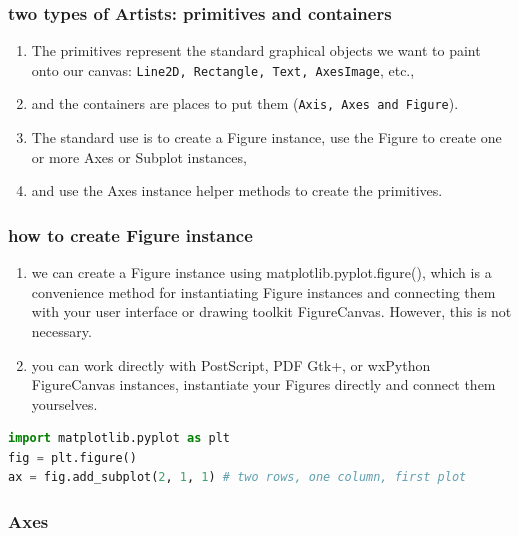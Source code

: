 \documentclass[UTF8,a4paper,12pt]{ctexart}  %
\providecommand{\tightlist}{\setlength{\itemsep}{0pt}\setlength{\parskip}{0pt}}
\newcommand{\passthrough}[1]{\lstset{mathescape=false}#1\lstset{mathescape=true}}
\begin{document}
\hypertarget{two-types-of-artists-primitives-and-containers}{%
\subsubsection{two types of Artists: primitives and containers}\label{two-types-of-artists-primitives-and-containers}}

\begin{enumerate}
\def\labelenumi{\arabic{enumi}.}
\tightlist
\item
  The primitives represent the standard graphical objects we want to
  paint onto our canvas: \passthrough{\lstinline!Line2D, Rectangle, Text, AxesImage!}, etc.,
\item
  and the containers are places to put them (\passthrough{\lstinline!Axis, Axes and Figure!}).
\item
  The standard use is to create a Figure instance, use the Figure to
  create one or more Axes or Subplot instances,
\item
  and use the Axes instance helper methods to create the primitives.
\end{enumerate}

\hypertarget{how-to-create-figure-instance}{%
\subsubsection{how to create Figure instance}\label{how-to-create-figure-instance}}

\begin{enumerate}
\def\labelenumi{\arabic{enumi}.}
\tightlist
\item
  we can create a Figure instance using matplotlib.pyplot.figure(),
  which is a convenience method for instantiating Figure instances and
  connecting them with your user interface or drawing toolkit
  FigureCanvas. However, this is not necessary.
\item
  you can work directly with PostScript, PDF Gtk+, or wxPython
  FigureCanvas instances, instantiate your Figures directly and
  connect them yourselves.
\end{enumerate}

\begin{lstlisting}[language=Python]
import matplotlib.pyplot as plt
fig = plt.figure()
ax = fig.add_subplot(2, 1, 1) # two rows, one column, first plot
\end{lstlisting}

\hypertarget{axes-1}{%
\subsubsection{Axes}\label{axes-1}}
\end{document}
